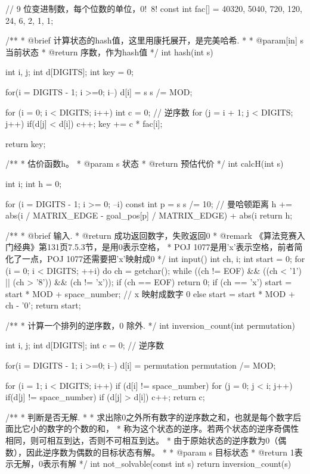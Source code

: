 \begin{Codex}[label=eight_digits_astar.c]
// 9 位变进制数，每个位数的单位，0!~8!
const int fac[] = {40320, 5040, 720, 120, 24, 6, 2, 1, 1};

/**
 * @brief 计算状态的hash值，这里用康托展开，是完美哈希.
 *
 * @param[in] s 当前状态
 * @return 序数，作为hash值
 */
int hash(int s) {
    int i, j;
    int d[DIGITS];
    int key = 0;

    for(i = DIGITS - 1; i >=0; i--) {
        d[i] = s %
        s /= MOD;
    }
    
    for (i = 0; i < DIGITS; i++) {
        int c = 0; // 逆序数
        for (j = i + 1; j < DIGITS; j++) {
            if(d[j] < d[i]) {
                c++;
            }
        }
        key += c * fac[i];
    }
    
    return key;
}


/**
 * 估价函数h。
 * @param s 状态
 * @return 预估代价
 */
int calcH(int s) {
    int i;
    int h = 0;
    
    for (i = DIGITS - 1; i >= 0; --i) {
        const int p = s %
        s /= 10;
        // 曼哈顿距离
        h += abs(i / MATRIX_EDGE - goal_pos[p] / MATRIX_EDGE) +
            abs(i %
    }
    return h;
}

/**
 * @brief 输入.
 * @return  成功返回数字，失败返回0
 * @remark 《算法竞赛入门经典》第131页7.5.3节，是用0表示空格，
 * POJ 1077是用'x'表示空格，前者简化了一点，POJ 1077还需要把'x'映射成0
 */
int input() {
    int ch, i;
    int start = 0;
    for (i = 0; i < DIGITS; ++i) {
        do {
            ch = getchar();
        } while ((ch != EOF) && ((ch < '1') || (ch > '8')) && (ch != 'x'));
        if (ch == EOF) return 0;
        if (ch == 'x') start = start * MOD + space_number; // x 映射成数字 0
        else             start = start * MOD + ch - '0';
    }
    return start;
}

/**
 * 计算一个排列的逆序数，0 除外.
 */
int inversion_count(int permutation) {
    int i, j;
    int d[DIGITS];
    int c = 0; // 逆序数

    for(i = DIGITS - 1; i >=0; i--) {
        d[i] = permutation %
        permutation /= MOD;
    }
    
    for (i = 1; i < DIGITS; i++)  if (d[i] != space_number) {
        for (j = 0; j < i; j++) {
            if(d[j] != space_number) {
                if (d[j] > d[i]) {
                    c++;
                }
            }
        }
    }
    return c;
}

/**
 * 判断是否无解.
 *
 * 求出除0之外所有数字的逆序数之和，也就是每个数字后面比它小的数字的个数的和，
 * 称为这个状态的逆序。若两个状态的逆序奇偶性相同，则可相互到达，否则不可相互到达。
 * 由于原始状态的逆序数为0（偶数），因此逆序数为偶数的目标状态有解。
 *
 * @param s 目标状态
 * @return 1表示无解，0表示有解
 */
int not_solvable(const int s) {
    return inversion_count(s) %
}


\end{Codex}
